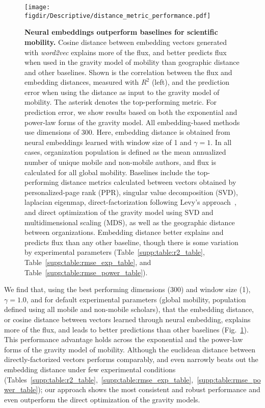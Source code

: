 \documentclass[12pt,a4paper]{article}
\def\figdir{../Figs}
\newcommand{\mycaption}[2]{%
  \caption[#1]{\textbf{#1} \small#2}%
}
\begin{document}
%
%
\begin{figure}[ht!]
	\centering
	\texttt{[image: \\figdir/Descriptive/distance\_metric\_performance.pdf]}
	\mycaption
	{Neural embeddings outperform baselines for scientific mobility.}
	{
		Cosine distance between embedding vectors generated with \textit{word2vec} explains more of the flux, and better predicts flux when used in the gravity model of mobility than geographic distance and other baselines.
		Shown is the correlation between the flux and embedding distances, measured with $R^{2}$ (left), and the prediction error when using the distance as input to the gravity model of mobility.
    The asterisk denotes the top-performing metric.
		For prediction error, we show results based on both the exponential and power-law forms of the gravity model.
		All embedding-based methods use dimensions of 300.
		Here, embedding distance is obtained from neural embeddings learned with window size of 1 and $\gamma = 1$.
		In all cases, organization population is defined as the mean annualized number of unique mobile and non-mobile authors, and flux is calculated for all global mobility.
		Baselines include the top-performing distance metrics calculated between vectors obtained by personalized-page rank (PPR), singular value decomposition (SVD), laplacian eigenmap, direct-factorization following Levy's approach~\autocite{levy2014neural}, and direct optimization of the gravity model using SVD and multidimensional scaling (MDS), as well as the geographic distance between organizations.
		Embedding distance better explains and predicts flux than any other baseline, though there is some variation by experimental parameters (Table~\ref{supp:table:r2_table}, Table~\ref{supp:table:rmse_exp_table}, and Table~\ref{supp:table:rmse_power_table}).
	}
	\label{fig:supp:distancemetrics}
\end{figure}


We find that, using the best performing dimensions (300) and window size (1),  $\gamma = 1.0$, and for default experimental parameters (global mobility, population defined using all mobile and non-mobile scholars), that the embedding distance, or cosine distance between vectors learned through neural embedding, explains more of the flux, and leads to better predictions than other baselines (Fig.~\ref{fig:supp:distancemetrics}).
This performance advantage holds across the exponential and the power-law forms of the gravity model of mobility.
Although the euclidean distance between directly-factorized vectors performs comparably, and even narrowly beats out the embedding distance under few experimental conditions (Tables~\ref{supp:table:r2_table},~\ref{supp:table:rmse_exp_table},~\ref{supp:table:rmse_power_table}); our approach shows the most consistent and robust performance and even outperform the direct optimization of the gravity models. 
\end{document}
